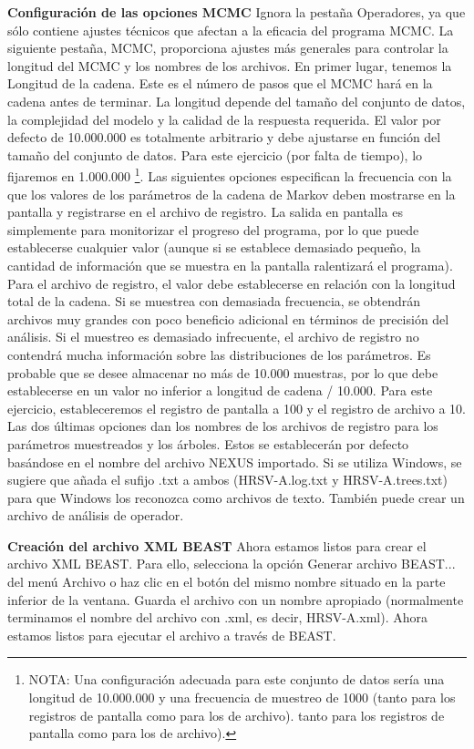 \textbf{Configuración de las opciones MCMC}
Ignora la pestaña Operadores, ya que sólo contiene ajustes técnicos que afectan a la eficacia del programa MCMC. La siguiente pestaña, MCMC, proporciona ajustes más generales para controlar la longitud del MCMC y los nombres de los archivos. En primer lugar, tenemos la Longitud de la cadena. Este es el número de pasos que el MCMC hará en la cadena antes de terminar. La longitud depende del tamaño del conjunto de datos, la complejidad del modelo y la calidad de la respuesta requerida. El valor por defecto de 10.000.000 es totalmente arbitrario y debe ajustarse en función del tamaño del conjunto de datos. Para este ejercicio (por falta de tiempo), lo fijaremos en 1.000.000 \footnote{NOTA: Una configuración adecuada para este conjunto de datos sería una longitud de 10.000.000 y una frecuencia de muestreo de 1000 (tanto para los registros de pantalla como para los de archivo). tanto para los registros de pantalla como para los de archivo).}. Las siguientes opciones especifican la frecuencia con la que los valores de los parámetros de la cadena de Markov deben mostrarse en la pantalla y registrarse en el archivo de registro. La salida en pantalla es simplemente para monitorizar el progreso del programa, por lo que puede establecerse cualquier valor (aunque si se establece demasiado pequeño, la cantidad de información que se muestra en la pantalla ralentizará el programa). Para el archivo de registro, el valor debe establecerse en relación con la longitud total de la cadena. Si se muestrea con demasiada frecuencia, se obtendrán archivos muy grandes con poco beneficio adicional en términos de precisión del análisis. Si el muestreo es demasiado infrecuente, el archivo de registro no contendrá mucha información sobre las distribuciones de los parámetros. Es probable que se desee almacenar no más de 10.000 muestras, por lo que debe establecerse en un valor no inferior a longitud de cadena / 10.000. Para este ejercicio, estableceremos el registro de pantalla a 100 y el registro de archivo a 10. Las dos últimas opciones dan los nombres de los archivos de registro para los parámetros muestreados y los árboles. Estos se establecerán por defecto basándose en el nombre del archivo NEXUS importado. Si se utiliza Windows, se sugiere que añada el sufijo .txt a ambos (HRSV-A.log.txt y HRSV-A.trees.txt) para que Windows los reconozca como archivos de texto. También puede crear un archivo de análisis de operador.

\textbf{Creación del archivo XML BEAST}
Ahora estamos listos para crear el archivo XML BEAST. Para ello, selecciona la opción Generar archivo BEAST... del menú Archivo o haz clic en el botón del mismo nombre situado en la parte inferior de la ventana. Guarda el archivo con un nombre apropiado (normalmente terminamos el nombre del archivo con .xml, es decir, HRSV-A.xml). Ahora estamos listos para ejecutar el archivo a través de BEAST.

